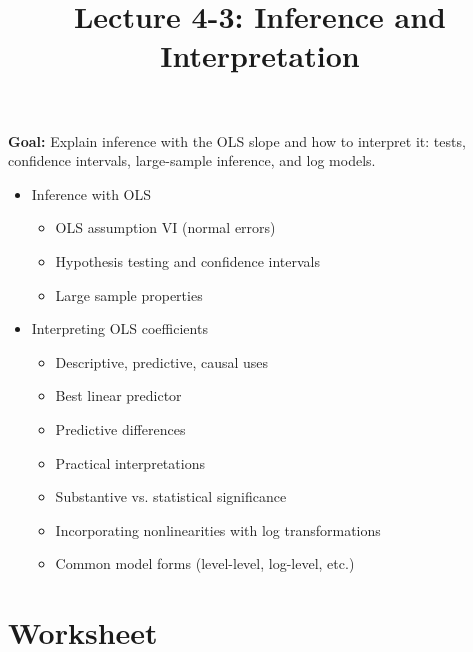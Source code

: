 \documentclass[12pt]{article}
\title{\Large Lecture 4-3: Inference and Interpretation}
\author{}
\date{}
\begin{document}
\maketitle
\vspace{-6em}

\noindent \textbf{Goal:} Explain inference with the OLS slope and how to interpret it: tests, confidence intervals, large-sample inference, and log models.\medskip

\begin{itemize}\setlength{\itemsep}{1em}
\item Inference with OLS
\begin{itemize}
\item OLS assumption VI (normal errors)
\item Hypothesis testing and confidence intervals
\item Large sample properties
\end{itemize}
\item Interpreting OLS coefficients
\begin{itemize}
\item Descriptive, predictive, causal uses
\item Best linear predictor
\item Predictive differences
\item Practical interpretations
\item Substantive vs. statistical significance
\item Incorporating nonlinearities with log transformations
\item Common model forms (level-level, log-level, etc.)
\end{itemize}
\end{itemize}


\clearpage


\section*{Worksheet}
\end{document}
